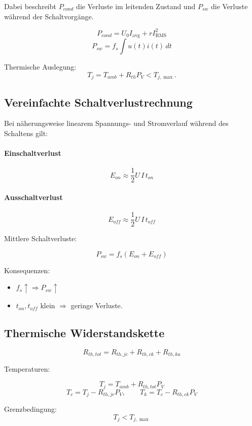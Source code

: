 Dabei beschreibt $P_{cond}$ die Verluste im leitenden Zustand
und $P_{sw}$ die Verluste während der Schaltvorgänge.

\[
P_{cond} = U_0 I_{\mathrm{avg}} + r I_{\mathrm{RMS}}^2
\]
\[
P_{sw} = f_s \int u(t)i(t)\,dt
\]

Thermische Auslegung:
\[
T_j = T_{amb} + R_{th} P_V < T_{j,\max}.
\]

\subsection{Vereinfachte Schaltverlustrechnung}

Bei näherungsweise linearem Spannungs- und Stromverlauf während des Schaltens gilt:

\paragraph{Einschaltverlust}

\[
\boxed{E_{on} \approx \frac{1}{2} U \, I \, t_{on}}
\]

\paragraph{Ausschaltverlust}

\[
\boxed{E_{off} \approx \frac{1}{2} U \, I \, t_{off}}
\]

Mittlere Schaltverluste:

\[
\boxed{
P_{sw} = f_s \left(E_{on} + E_{off}\right)
}
\]

Konsequenzen:
\begin{itemize}
\item $f_s \uparrow \Rightarrow P_{sw} \uparrow$
\item $t_{on}, t_{off}$ klein $\Rightarrow$ geringe Verluste.
\end{itemize}

\subsection{Thermische Widerstandskette}

\[
\boxed{R_{th,tot} = R_{th,jc} + R_{th,ck} + R_{th,ka}}
\]

Temperaturen:

\[
T_j = T_{amb} + R_{th,tot} P_V
\]
\[
T_c = T_j - R_{th,jc} P_V,
\qquad
T_k = T_c - R_{th,ck} P_V
\]

Grenzbedingung:
\[
\boxed{T_j < T_{j,\max}}
\]
